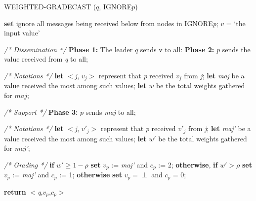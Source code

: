 \documentclass[conference]{IEEEtran}
\begin{document}
\begin{algorithm}
\caption{WEIGHTED-GRADECAST ($q$, IGNORE{$p$})}
\begin{algorithmic}[1]
\STATE \textbf{set} ignore all messages being received below from nodes in IGNORE\textit{p};
\STATE $v$ = \lq{the input value}\rq
\ENDIF
\item[]
\item[]
\textit{/* Dissemination */}
\STATE \textbf{Phase 1:} The leader $q$ sends v to all:
\STATE \textbf{Phase 2:} \textit{p} sends the value received from \textit{q} to all;
\item[]
\item[]
\textit{/* Notations */}
\STATE \textbf{let} $<$\textit{j}, \textit{${v}_{j}$}$>$ represent that \textit{p} received \textit{${v}_{j}$} from \textit{j};
\STATE \textbf{let} \textit{maj} be a value received the most among such values;
\STATE \textbf{let} $w$ be the total weights gathered for $maj$;
\item[]
\item[]
\textit{/* Support */}
\STATE \textbf{Phase 3:}  
\STATE $p$ sends \textit{maj} to all;
\ENDIF
\item[]
\item[]
\textit{/* Notations */}
\STATE \textbf{let} $<$\textit{j}, \textit{${v'}_{j}$}$>$ represent that \textit{p} received \textit{${v'}_{j}$} from \textit{j};
\STATE \textbf{let} \textit{maj'} be a value received the most among such values;
\STATE \textbf{let} $w'$ be the total weights gathered for \textit{maj'};
\item[]
\item[]
\textit{/* Grading */}
\STATE \textbf{if} $w' \geq 1 - \rho $  \textbf{set} \textit{${v}_{p}$} := \textit{maj'} and \textit{${c}_{p}$} := 2;
\STATE \textbf{otherwise}, \textbf{if} $w' > \rho $ \textbf{set} \textit{${v}_{p}$} := \textit{maj'} and \textit{${c}_{p}$} := 1;
\STATE  \textbf{otherwise} \textbf{set} $\textit{${v}_{p}$} = \perp$ and \textit{${c}_{p}$} = 0;
\item[]
\STATE \textbf{return} $<$\textit{q},\textit{${v}_{p}$},\textit{${c}_{p}$}$>$
\end{algorithmic}
\end{algorithm}
\end{document}
